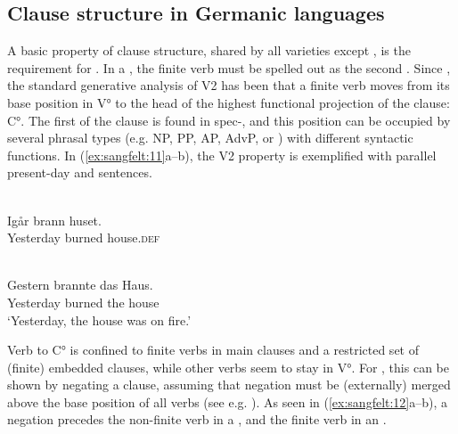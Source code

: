\documentclass[output=paper, colorlinks, citecolor=brown]{langscibook}
\begin{document}
\subsection{Clause structure in Germanic languages}\label{sec:sangfelt:3.1}

A basic property of  clause structure, shared by all varieties except , is the requirement for . In a  , the finite verb must be spelled out as the second . Since \citet{denBesten1983}, the standard generative analysis of V2 has been that a finite verb moves from its base position in V° to the head of the highest functional projection of the clause: C°. The first  of the clause is found in spec-, and this position can be occupied by several phrasal types (e.g. NP, PP, AP, AdvP, or ) with different syntactic functions. In (\ref{ex:sangfelt:11}a–b), the V2 property is exemplified with parallel present-day  and  sentences.

\ea
\label{ex:sangfelt:11}
\begin{multicols}{2}\raggedcolumns
\ea {}\\
\gll Igår brann huset. \\
 Yesterday burned house.\textsc{def}\\\label{ex:sangfelt:11a}\columnbreak
 
\ex {}\\
\gll Gestern brannte das Haus.\\
 Yesterday burned the house\\
\glt ‘Yesterday, the house was on fire.’\label{ex:sangfelt:11b}
\z 
\end{multicols}
\z 

Verb  to C° is confined to finite verbs in main clauses and a restricted set of (finite) embedded clauses, while other verbs seem to stay in V°. For , this can be shown by negating a clause, assuming that negation must be (externally) merged above the base position of all verbs (see e.g. \citealt{Zeijlstra2013}). As seen in (\ref{ex:sangfelt:12}a–b), a negation precedes the non-finite verb in a , and the finite verb in an .
\end{document}
